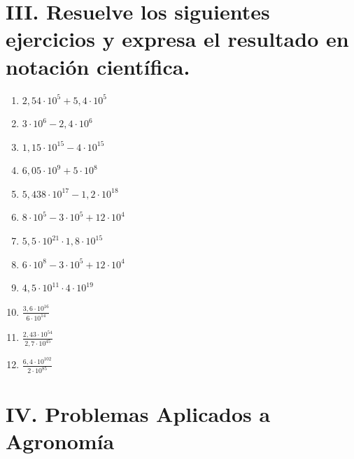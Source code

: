 \documentclass[12pt]{article}
\begin{document}
	\section*{III. Resuelve los siguientes ejercicios y expresa el resultado en notación científica.}
	
	\begin{enumerate}
		\item $2{,}54 \cdot 10^5 + 5{,}4 \cdot 10^5$
		\item $3 \cdot 10^6 - 2{,}4 \cdot 10^6$
		\item $1{,}15 \cdot 10^{15} - 4 \cdot 10^{15}$
		\item $6{,}05 \cdot 10^9 + 5 \cdot 10^8$
		\item $5{,}438 \cdot 10^{17} - 1{,}2 \cdot 10^{18}$
		\item $8 \cdot 10^5 - 3 \cdot 10^5 + 12 \cdot 10^4$
		\item $5{,}5 \cdot 10^{21} \cdot 1{,}8 \cdot 10^{15}$
		\item $6 \cdot 10^8 - 3 \cdot 10^5 + 12 \cdot 10^4$
		\item $4{,}5 \cdot 10^{11} \cdot 4 \cdot 10^{19}$
		\item $\frac{3{,}6 \cdot 10^{16}}{6 \cdot 10^{14}}$
		\item $\frac{2{,}43 \cdot 10^{54}}{2{,}7 \cdot 10^{45}}$
		\item $\frac{6{,}4 \cdot 10^{102}}{2 \cdot 10^{85}}$
	\end{enumerate}
	
	\section*{IV. Problemas Aplicados a Agronomía}
	
\end{document}
